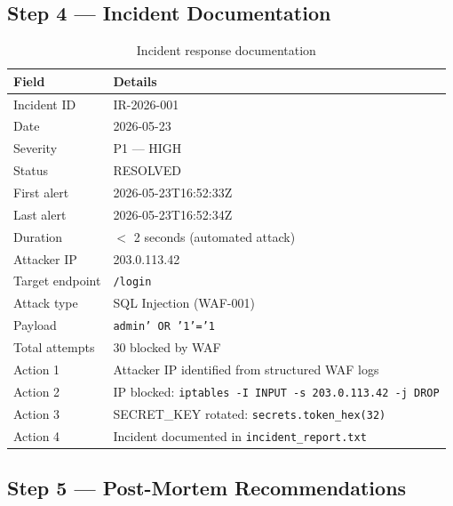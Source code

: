 \documentclass[12pt,a4paper]{report}
\begin{document}
\subsection{Step 4 — Incident Documentation}

\begin{table}[H]
\centering
\begin{tabularx}{\textwidth}{l X}
\toprule
\textbf{Field} & \textbf{Details} \\
\midrule
Incident ID & IR-2026-001 \\
Date & 2026-05-23 \\
Severity & P1 — HIGH \\
Status & RESOLVED \\
\midrule
First alert & 2026-05-23T16:52:33Z \\
Last alert & 2026-05-23T16:52:34Z \\
Duration & $<$ 2 seconds (automated attack) \\
\midrule
Attacker IP & 203.0.113.42 \\
Target endpoint & \texttt{/login} \\
Attack type & SQL Injection (WAF-001) \\
Payload & \texttt{admin' OR '1'='1} \\
Total attempts & 30 blocked by WAF \\
\midrule
Action 1 & Attacker IP identified from structured WAF logs \\
Action 2 & IP blocked: \texttt{iptables -I INPUT -s 203.0.113.42 -j DROP} \\
Action 3 & SECRET\_KEY rotated: \texttt{secrets.token\_hex(32)} \\
Action 4 & Incident documented in \texttt{incident\_report.txt} \\
\bottomrule
\end{tabularx}
\caption{Incident response documentation}
\end{table}

\subsection{Step 5 — Post-Mortem Recommendations}
\end{document}

